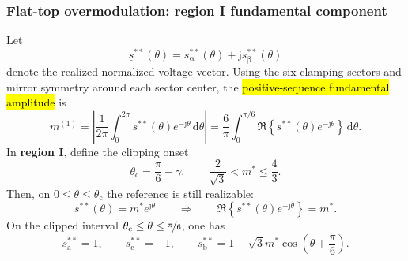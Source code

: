 \begin{frame}
    \frametitle{Flat-top overmodulation: region I fundamental component}
    Let
    \begin{equation}
        \underline{s}^{**}(\theta)=s_{\upalpha}^{**}(\theta)+\mathrm{j}s_{\upbeta}^{**}(\theta)
    \end{equation}
    denote the realized normalized voltage vector. \pause Using the six clamping sectors and mirror symmetry around each sector center, the \hl{positive-sequence fundamental amplitude} is
    \begin{equation}
        m^{(1)}=
        \left|
        \frac{1}{2\pi}\int_{0}^{2\pi}\underline{s}^{**}(\theta)e^{-\mathrm{j}\theta}\,\mathrm{d}\theta
        \right|
        =
        \frac{6}{\pi}\int_{0}^{\pi/6}\Re\!\left\{\underline{s}^{**}(\theta)e^{-\mathrm{j}\theta}\right\}\,\mathrm{d}\theta.
        \label{eq:flat_top_fundamental_half_sector}
    \end{equation}\pause
    In \textbf{region I}, define the clipping onset
    \begin{equation}
        \theta_\mathrm{c}=\frac{\pi}{6}-\gamma,
        \qquad
        \frac{2}{\sqrt{3}}<m^*\leq \frac{4}{3}.
    \end{equation}\pause
    Then, on \(0\leq \theta\leq \theta_\mathrm{c}\) the reference is still realizable:
    \begin{equation}
        \underline{s}^{**}(\theta)=m^*e^{\mathrm{j}\theta}
        \qquad \Rightarrow \qquad
        \Re\!\left\{\underline{s}^{**}(\theta)e^{-\mathrm{j}\theta}\right\}=m^*.
    \end{equation}\pause
    On the clipped interval \(\theta_\mathrm{c}\leq \theta\leq \nicefrac{\pi}{6}\), one has
    \begin{equation}
        s_\mathrm{a}^{**}=1, \qquad
        s_\mathrm{c}^{**}=-1, \qquad
        s_\mathrm{b}^{**}=1-\sqrt{3}m^*\cos\!\left(\theta+\frac{\pi}{6}\right).
    \end{equation}
\end{frame}



